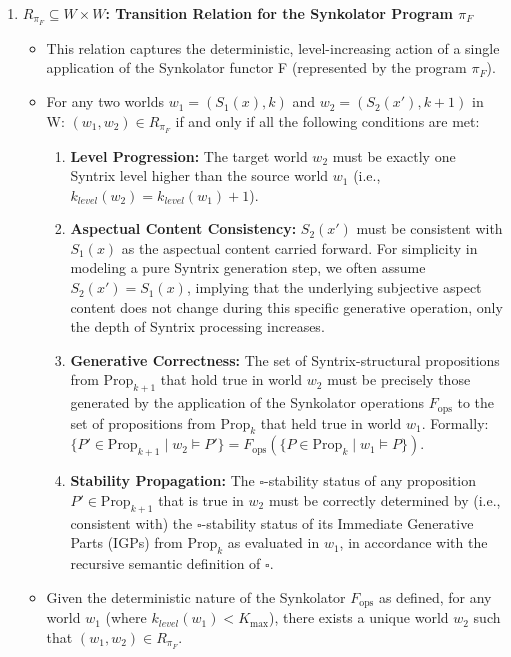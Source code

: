 \documentclass[
    12pt,              %
    a4paper,           %
    headings=normal,   %
    twoside=true,      %
    BCOR=8mm,          %
]{scrbook}
\newcommand{\BoxSyn}{\square}
\newcommand{\Kmax}{K_{\text{max}}}
\newcommand{\Propk}[1]{\text{Prop}_{#1}}
\newcommand{\fops}{F_{\text{ops}}}
\begin{document}
\begin{enumerate}[label=\arabic*.]
    \item  \textbf{\(R_{\pi_F} \subseteq W \times W\): Transition Relation for the Synkolator Program \(\pi_F\)}
        \begin{itemize}
            \item   This relation captures the deterministic, level-increasing action of a single application of the Synkolator functor F (represented by the program \(\pi_F\)).
            \item   For any two worlds \(w_1 = (S_1(x), k)\) and \(w_2 = (S_2(x'), k+1)\) in W: \((w_1, w_2) \in R_{\pi_F}\) if and only if all the following conditions are met:
                \begin{enumerate}[label=(\alph*)]
                    \item  \textbf{Level Progression:} The target world \(w_2\) must be exactly one Syntrix level higher than the source world \(w_1\) (i.e., \(k_{level}(w_2) = k_{level}(w_1) + 1\)).
                    \item  \textbf{Aspectual Content Consistency:} \(S_2(x')\) must be consistent with \(S_1(x)\) as the aspectual content carried forward. For simplicity in modeling a pure Syntrix generation step, we often assume \(S_2(x') = S_1(x)\), implying that the underlying subjective aspect content does not change during this specific generative operation, only the depth of Syntrix processing increases.
                    \item  \textbf{Generative Correctness:} The set of Syntrix-structural propositions from \(\Propk{k+1}\) that hold true in world \(w_2\) must be precisely those generated by the application of the Synkolator operations \(\fops\) to the set of propositions from \(\Propk{k}\) that held true in world \(w_1\). Formally: \(\{P' \in \Propk{k+1} \mid w_2 \vDash P'\} = \fops(\{P \in \Propk{k} \mid w_1 \vDash P\})\).
                    \item  \textbf{Stability Propagation:} The \(\BoxSyn\)-stability status of any proposition \(P' \in \Propk{k+1}\) that is true in \(w_2\) must be correctly determined by (i.e., consistent with) the \(\BoxSyn\)-stability status of its Immediate Generative Parts (IGPs) from \(\Propk{k}\) as evaluated in \(w_1\), in accordance with the recursive semantic definition of \(\BoxSyn\).
                \end{enumerate} 
            \item   Given the deterministic nature of the Synkolator \(\fops\) as defined, for any world \(w_1\) (where \(k_{level}(w_1) < \Kmax\)), there exists a unique world \(w_2\) such that \((w_1, w_2) \in R_{\pi_F}\).
        \end{itemize} 


\end{enumerate}
\end{document}
